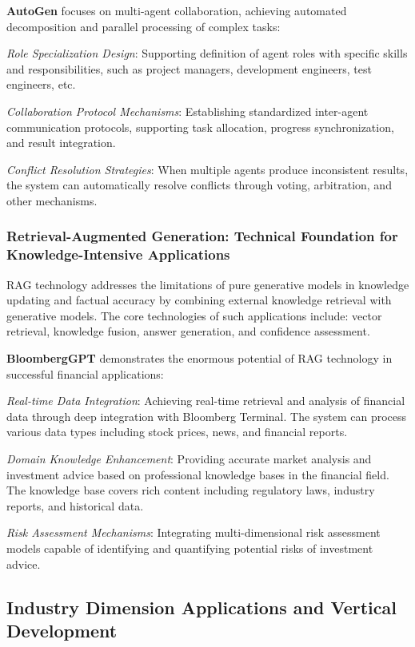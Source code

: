 \documentclass{article}
\begin{document}
\textbf{AutoGen} focuses on multi-agent collaboration, achieving automated decomposition and parallel processing of complex tasks:

\textit{Role Specialization Design}: Supporting definition of agent roles with specific skills and responsibilities, such as project managers, development engineers, test engineers, etc.

\textit{Collaboration Protocol Mechanisms}: Establishing standardized inter-agent communication protocols, supporting task allocation, progress synchronization, and result integration.

\textit{Conflict Resolution Strategies}: When multiple agents produce inconsistent results, the system can automatically resolve conflicts through voting, arbitration, and other mechanisms.

\subsubsection{Retrieval-Augmented Generation: Technical Foundation for Knowledge-Intensive Applications}
RAG technology addresses the limitations of pure generative models in knowledge updating and factual accuracy by combining external knowledge retrieval with generative models. The core technologies of such applications include: vector retrieval, knowledge fusion, answer generation, and confidence assessment.

\textbf{BloombergGPT} demonstrates the enormous potential of RAG technology in successful financial applications:

\textit{Real-time Data Integration}: Achieving real-time retrieval and analysis of financial data through deep integration with Bloomberg Terminal. The system can process various data types including stock prices, news, and financial reports.

\textit{Domain Knowledge Enhancement}: Providing accurate market analysis and investment advice based on professional knowledge bases in the financial field. The knowledge base covers rich content including regulatory laws, industry reports, and historical data.

\textit{Risk Assessment Mechanisms}: Integrating multi-dimensional risk assessment models capable of identifying and quantifying potential risks of investment advice.

\subsection{Industry Dimension Applications and Vertical Development}
\end{document}
